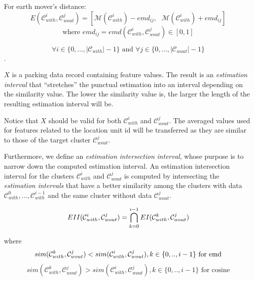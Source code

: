 For earth mover's distance:
\begin{equation}
E(\mathcal{C}_{with}^i,\mathcal{C}_{wout}^j) = [\mathcal{M}(\mathcal{C}_{with}^i) - emd_{ij},   \text{    }\mathcal{M}(\mathcal{C}_{with}^i) + emd_{ij}]
\end{equation}
$$\text{where } emd_{ij} = emd(\mathcal{C}_{with}^i,\mathcal{C}_{wout}^j) \in [0,1]$$

$$\forall i \in \{0,...,|\mathcal{C}_{with}|-1\} \text{ and } \forall j \in \{0,...,|\mathcal{C}_{wout}|-1\}$$.

$X$ is a parking data record containing feature values.
The result is an \textit{estimation interval} that ``stretches'' the punctual estimation into an interval depending on the similarity value.
The lower the similarity value is, the larger the length of the resulting estimation interval will be.

Notice that $X$ should be valid for both $\mathcal{C}_{with}^i$ and $\mathcal{C}_{wout}^j$. The averaged values used for features related to the location unit id will be transferred as they are similar to those of the target cluster $\mathcal{C}_{wout}^j$.

Furthermore, we define an \textit{estimation intersection interval}, whose purpose is to narrow down the computed estimation interval.
An estimation intersection interval for the clusters $\mathcal{C}_{with}^i$ and $\mathcal{C}_{wout}^j$ is computed by intersecting the \textit{estimation intervals} that have a better similarity among the clusters with data $\mathcal{C}_{with}^{0}, ..., \mathcal{C}_{with}^{i-1}$ and the same cluster without data $\mathcal{C}_{wout}^j$.

\begin{equation}
EII(\mathcal{C}_{with}^i,\mathcal{C}_{wout}^j) = \bigcap_{k=0}^{i-1} EI(\mathcal{C}_{with}^k,\mathcal{C}_{wout}^j) \\
\end{equation}

where
\begin{equation}
sim(\mathcal{C}_{with}^k,\mathcal{C}_{wout}^j) < sim(\mathcal{C}_{with}^i,\mathcal{C}_{wout}^j), k \in \{0,..,i - 1\} \text{ for emd}\\
\end{equation}
\begin{equation}
sim(\mathcal{C}_{with}^k,\mathcal{C}_{wout}^j) > sim(\mathcal{C}_{with}^i,\mathcal{C}_{wout}^j), k \in \{0,..,i - 1\} \text{ for cosine} 
\end{equation}

